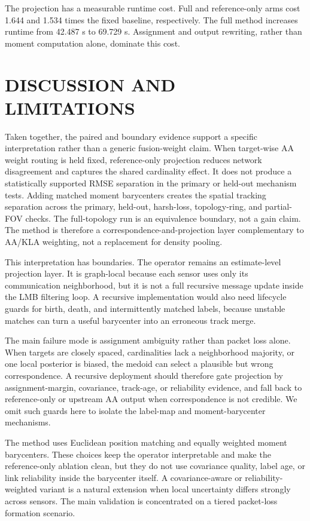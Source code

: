 \documentclass{IEEEtaes}
\begin{document}

The projection has a measurable runtime cost. Full and reference-only arms cost 1.644 and 1.534 times the fixed baseline, respectively. The full method increases runtime from 42.487 s to 69.729 s. Assignment and output rewriting, rather than moment computation alone, dominate this cost.

\section{DISCUSSION AND LIMITATIONS}
Taken together, the paired and boundary evidence support a specific interpretation rather than a generic fusion-weight claim. When target-wise AA weight routing is held fixed, reference-only projection reduces network disagreement and captures the shared cardinality effect. It does not produce a statistically supported RMSE separation in the primary or held-out mechanism tests. Adding matched moment barycenters creates the spatial tracking separation across the primary, held-out, harsh-loss, topology-ring, and partial-FOV checks. The full-topology run is an equivalence boundary, not a gain claim. The method is therefore a correspondence-and-projection layer complementary to AA/KLA weighting, not a replacement for density pooling.

This interpretation has boundaries. The operator remains an estimate-level projection layer. It is graph-local because each sensor uses only its communication neighborhood, but it is not a full recursive message update inside the LMB filtering loop. A recursive implementation would also need lifecycle guards for birth, death, and intermittently matched labels, because unstable matches can turn a useful barycenter into an erroneous track merge.

The main failure mode is assignment ambiguity rather than packet loss alone. When targets are closely spaced, cardinalities lack a neighborhood majority, or one local posterior is biased, the medoid can select a plausible but wrong correspondence. A recursive deployment should therefore gate projection by assignment-margin, covariance, track-age, or reliability evidence, and fall back to reference-only or upstream AA output when correspondence is not credible. We omit such guards here to isolate the label-map and moment-barycenter mechanisms.

The method uses Euclidean position matching and equally weighted moment barycenters. These choices keep the operator interpretable and make the reference-only ablation clean, but they do not use covariance quality, label age, or link reliability inside the barycenter itself. A covariance-aware or reliability-weighted variant is a natural extension when local uncertainty differs strongly across sensors. The main validation is concentrated on a tiered packet-loss formation scenario.
\end{document}
